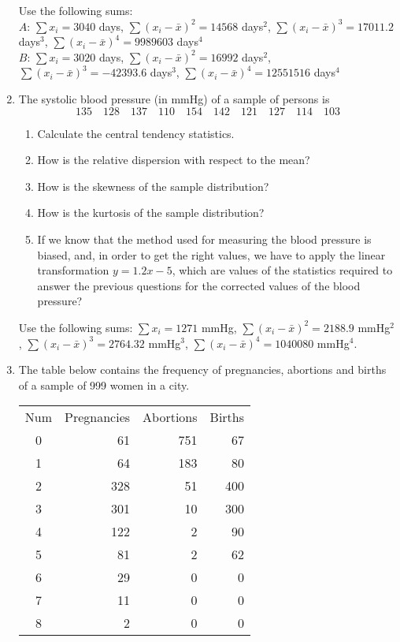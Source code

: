 \begin{enumerate}[leftmargin=*]
Use the following sums:\\
$A$: $\sum x_i= 3040$ days, $\sum (x_i-\bar x)^2=14568$ days$^2$, $\sum (x_i-\bar x)^3=17011.2$ days$^3$, $\sum
(x_i-\bar x)^4=9989603$ days$^4$\\
$B$: $\sum x_i= 3020$ days, $\sum (x_i-\bar x)^2=16992$ days$^2$, $\sum (x_i-\bar x)^3=-42393.6$ days$^3$, $\sum
(x_i-\bar x)^4=12551516$ days$^4$\\

\item The systolic blood pressure (in mmHg) of a sample of persons is
\[
135\quad 128\quad 137\quad 110\quad 154\quad 142\quad 121\quad 127\quad 114\quad 103
\]

\begin{enumerate}
\item Calculate the central tendency statistics.
\item How is the relative dispersion with respect to the mean?
\item How is the skewness of the sample distribution?
\item How is the kurtosis of the sample distribution?
\item If we know that the method used for measuring the blood pressure is biased, and, in order to get the right values,
we have to apply the linear transformation $y=1.2x-5$, which are values of the statistics required to answer the
previous questions for the corrected values of the blood pressure?
\end{enumerate}


Use the following sums: $\sum x_i= 1271$ mmHg, $\sum (x_i-\bar x)^2=2188.9$ mmHg$^2$, $\sum (x_i-\bar x)^3=2764.32$
mmHg$^3$, $\sum (x_i-\bar x)^4=1040080$ mmHg$^4$.


\item The table below contains the frequency of pregnancies, abortions and
births of a sample of 999 women in a city.

\begin{center}
\begin{tabular}{crrr}
\toprule
Num & Pregnancies & Abortions & Births\\
0 & 61 & 751 & 67 \\
1 & 64 & 183 & 80 \\
2 & 328 & 51 & 400 \\
3 & 301 & 10 & 300 \\
4 & 122 & 2 & 90 \\
5 & 81 & 2 & 62 \\
6 & 29 & 0 & 0 \\
7 & 11 & 0 & 0 \\
8 & 2 & 0 & 0 \\
\bottomrule
\end{tabular}
\end{center}


\end{enumerate}
